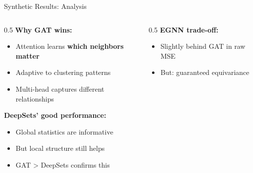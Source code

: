 \documentclass[aspectratio=169]{beamer}
\begin{document}
\begin{frame}{Synthetic Results: Analysis}
    \begin{columns}
        \begin{column}{0.5\textwidth}
            \textbf{Why GAT wins:}
            \begin{itemize}
                \item Attention learns \textbf{which neighbors matter}
                \item Adaptive to clustering patterns
                \item Multi-head captures different relationships
            \end{itemize}
            
            \vspace{0.5em}
            \textbf{DeepSets' good performance:}
            \begin{itemize}
                \item Global statistics are informative
                \item But local structure still helps
                \item GAT > DeepSets confirms this
            \end{itemize}
        \end{column}
        \begin{column}{0.5\textwidth}
            \textbf{EGNN trade-off:}
            \begin{itemize}
                \item Slightly behind GAT in raw MSE
                \item But: guaranteed equivariance
            \end{itemize}
            
        \end{column}
    \end{columns}
\end{frame}
\end{document}
